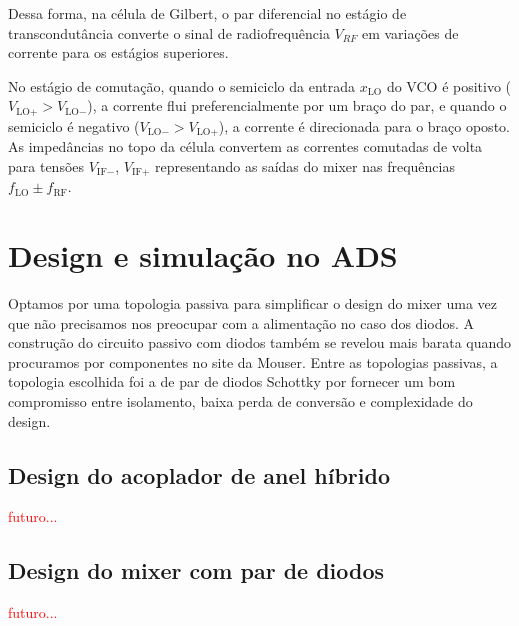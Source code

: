 \documentclass[10pt]{article}
\begin{document}
Dessa forma, na célula de Gilbert, o par diferencial no estágio de transcondutância converte o sinal de radiofrequência $V_{RF}$ em variações de corrente para os estágios superiores.

No estágio de comutação, quando o semiciclo da entrada $x_{\text{LO}}$  do VCO é positivo ($V_{\text{LO}+} > V_{\text{LO}-}$), a corrente flui preferencialmente por um braço do par, e quando o semiciclo é negativo ($V_{\text{LO}-} > V_{\text{LO}+}$), a corrente é direcionada para o braço oposto. As impedâncias no topo da célula convertem as correntes comutadas de volta para tensões $V_{\text{IF}-}$, $V_{\text{IF}+}$ representando as saídas do mixer nas frequências $f_{\text{LO}} \pm f_{\text{RF}}$.

\section{Design e simulação no ADS} \label{section:ADS}

Optamos por uma topologia passiva para simplificar o design do mixer uma vez que não precisamos nos preocupar com a alimentação no caso dos diodos. A construção do circuito passivo com diodos também se revelou mais barata quando procuramos por componentes no site da Mouser. Entre as topologias passivas, a topologia escolhida foi a de par de diodos Schottky por fornecer um bom compromisso entre isolamento, baixa perda de conversão e complexidade do design.

\subsection{Design do acoplador de anel híbrido}

\textcolor{red}{futuro...}

\subsection{Design do mixer com par de diodos}

\textcolor{red}{futuro...}

\newpage


\end{document}
